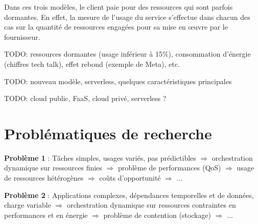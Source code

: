 Dans ces trois modèles, le client paie pour des ressources qui sont parfois dormantes. En effet, la mesure de l'usage du service s'effectue dans chacun des cas sur la quantité de ressources engagées pour sa mise en œuvre par le fournisseur. 

TODO: ressources dormantes (usage inférieur à 15\%), consommation d'énergie (chiffres tech talk), effet rebond (exemple de Meta), etc.

TODO: nouveau modèle, serverless, quelques caractéristiques principales

TODO: cloud public, FaaS, cloud privé, serverless ?

\section{Problématiques de recherche}


\textbf{Problème 1} : Tâches simples, usages variés, pas prédictibles $\Rightarrow$ orchestration dynamique sur ressources finies $\Rightarrow$ problème de performances (QoS) $\Rightarrow$ usage de ressources hétérogènes $\Rightarrow$ coûts d'opportunité $\Rightarrow$ ...



\textbf{Problème 2} : Applications complexes, dépendances temporelles et de données, charge variable $\Rightarrow$ orchestration dynamique sur ressources contraintes en performances et en énergie $\Rightarrow$ problème de contention (stockage) $\Rightarrow$ ...


